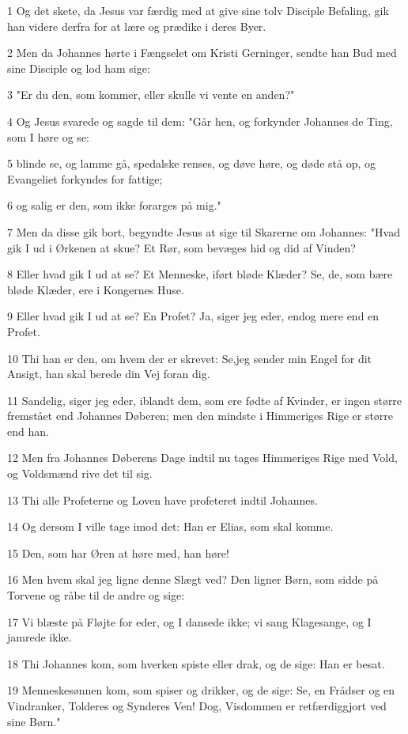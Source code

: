 \par 1 Og det skete, da Jesus var færdig med at give sine tolv Disciple Befaling, gik han videre derfra for at lære og prædike i deres Byer.
\par 2 Men da Johannes hørte i Fængselet om Kristi Gerninger, sendte han Bud med sine Disciple og lod ham sige:
\par 3 "Er du den, som kommer, eller skulle vi vente en anden?"
\par 4 Og Jesus svarede og sagde til dem: "Går hen, og forkynder Johannes de Ting, som I høre og se:
\par 5 blinde se, og lamme gå, spedalske renses, og døve høre, og døde stå op, og Evangeliet forkyndes for fattige;
\par 6 og salig er den, som ikke forarges på mig."
\par 7 Men da disse gik bort, begyndte Jesus at sige til Skarerne om Johannes: "Hvad gik I ud i Ørkenen at skue? Et Rør, som bevæges hid og did af Vinden?
\par 8 Eller hvad gik I ud at se? Et Menneske, iført bløde Klæder? Se, de, som bære bløde Klæder, ere i Kongernes Huse.
\par 9 Eller hvad gik I ud at se? En Profet? Ja, siger jeg eder, endog mere end en Profet.
\par 10 Thi han er den, om hvem der er skrevet: Se,jeg sender min Engel for dit Ansigt, han skal berede din Vej foran dig.
\par 11 Sandelig, siger jeg eder, iblandt dem, som ere fødte af Kvinder, er ingen større fremstået end Johannes Døberen; men den mindste i Himmeriges Rige er større end han.
\par 12 Men fra Johannes Døberens Dage indtil nu tages Himmeriges Rige med Vold, og Voldsmænd rive det til sig.
\par 13 Thi alle Profeterne og Loven have profeteret indtil Johannes.
\par 14 Og dersom I ville tage imod det: Han er Elias, som skal komme.
\par 15 Den, som har Øren at høre med, han høre!
\par 16 Men hvem skal jeg ligne denne Slægt ved? Den ligner Børn, som sidde på Torvene og råbe til de andre og sige:
\par 17 Vi blæste på Fløjte for eder, og I dansede ikke; vi sang Klagesange, og I jamrede ikke.
\par 18 Thi Johannes kom, som hverken spiste eller drak, og de sige: Han er besat.
\par 19 Menneskesønnen kom, som spiser og drikker, og de sige: Se, en Frådser og en Vindranker, Tolderes og Synderes Ven! Dog, Visdommen er retfærdiggjort ved sine Børn."
